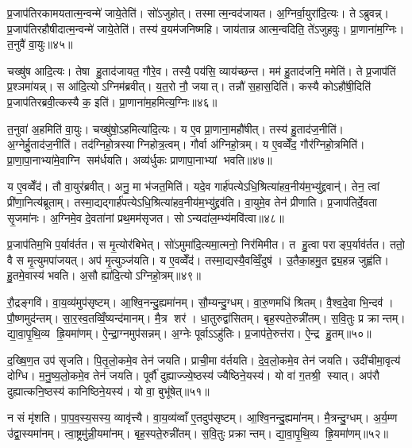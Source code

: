 प्र॒जाप॑तिरकामयतात्म॒न्वन्मे॑ जाये॒तेति॑। सो॑ऽजुहोत्। तस्मात्म॒न्वद॑जायत। अ॒ग्निर्वा॒युरा॑दि॒त्यः। तेऽब्रुवन्न्। प्र॒जाप॑तिरहौषीदात्म॒न्वन्मे॑ जाये॒तेति॑। तस्य॑ व॒यम॑जनिष्महि। जाय॑तान्न आत्म॒न्वदिति॒ ते॑ऽजुहवुः। प्रा॒णाना॑म॒ग्निः। त॒नुवै॑ वा॒युः॥४५॥

चख्षु॑ष आदि॒त्यः। तेषा हु॒ताद॑जायत॒ गौरे॒व। तस्यै॒ पय॑सि॒ व्याय॑च्छन्त। मम॑ हु॒ताद॑जनि॒ ममेति॑। ते प्र॒जाप॑तिं प्र॒श्ञमा॑यन्न्। स आ॑दि॒त्योऽग्निम॑ब्रवीत्। य॒त॒रो नौ॒ जयात्। तन्नौ॑ स॒हास॒दिति॑। कस्यै कोऽहौ॑षी॒दिति॑ प्र॒जाप॑तिरब्रवी॒त्कस्यै क॒ इति॑। प्रा॒णाना॑म॒हमित्य॒ग्निः॥४६॥

त॒नुवा॑ अ॒हमिति॑ वा॒युः। चख्षु॑षो॒ऽहमित्या॑दि॒त्यः। य ए॒व प्रा॒णाना॒महौ॑षीत्। तस्य॑ हु॒ताद॑ज॒नीति॑। अ॒ग्नेर्\mbox{}हु॒ताद॑ज॒नीति॑। तद॑ग्निहो॒त्रस्याग्निहोत्र॒त्वम्। गौर्वा अ॑ग्निहो॒त्रम्। य ए॒वव्वेँद॒ गौर॑ग्निहो॒त्रमिति॑। प्रा॒णा॒पा॒नाभ्या॑मे॒वाग्नि सम॑र्धयति। अव्य॑र्धुकः प्राणापा॒नाभ्यां भवति॥४७॥

य ए॒वव्वेँद॑। तौ वा॒युर॑ब्रवीत्। अनु॒ मा भ॑जत॒मिति॑। यदे॒व गार्\mbox{}ह॑पत्येऽधि॒श्रित्या॑हव॒नीय॑म॒भ्यु॑द्द्रवान्॑। तेन॒ त्वां प्री॑णा॒नित्य॑ब्रूताम्। तस्मा॒द्यद्गार्\mbox{}ह॑पत्येऽधि॒श्रित्या॑हव॒नीय॑म॒भ्यु॑द्द्रव॑ति। वा॒युमे॒व तेन॑ प्रीणाति। प्र॒जाप॑तिर्दे॒वता सृ॒जमा॑नः। अ॒ग्निमे॒व दे॒वता॑नां प्रथ॒मम॑सृजत। सोऽन्यदा॑ल॒म्भ्य॑मवि॑त्वा॥४८॥

प्र॒जाप॑तिम॒भि प॒र्याव॑र्तत। स मृ॒त्योर॑बिभेत्। सो॑ऽमुमा॑दि॒त्यमा॒त्मनो॒ निर॑मिमीत। त हु॒त्वा पराङ्प॒र्याव॑र्तत। ततो॒ वै स मृ॒त्युमपा॑जयत्। अप॑ मृ॒त्युञ्ज॑यति। य ए॒वव्वेँद॑। तस्मा॒द्यस्यै॒वव्विँ॒दुष॑। उ॒तैका॒हमु॒त द्व्य॒हन्न जुह्व॑ति। हु॒तमे॒वास्य॑ भवति। अ॒सौ ह्या॑दि॒त्योऽग्निहो॒त्रम्॥४९॥\anuvakamend[त॒नुवै॑ वा॒युर॒ग्निर्भ॑व॒त्यवि॑त्वा भव॒त्येक॑ञ्च]

रौ॒द्रङ्गवि॑। वा॒य॒व्य॑मुप॑सृष्टम्। आ॒श्वि॒नन्दु॒ह्यमा॑नम्। सौ॒म्यन्दु॒ग्धम्। वा॒रु॒णमधि॑ श्रितम्। वै॒श्व॒दे॒वा भि॒न्दव॑। पौ॒ष्णमुद॑न्तम्। सा॒र॒स्व॒तव्विँ॒ष्यन्द॑मानम्। मै॒त्र शर॑। धा॒तुरुद्वा॑सितम्। बृह॒स्पते॒रुन्नी॑तम्। स॒वि॒तुः प्र क्रान्तम्। द्या॒वा॒पृ॒थि॒व्य ह्रि॒यमा॑णम्। ऐ॒न्द्रा॒ग्नमुप॑सन्नम्। अ॒ग्नेः पूर्वाऽऽहु॑तिः। प्र॒जाप॑ते॒रुत्त॑रा। ऐ॒न्द्र हु॒तम्॥५०॥\anuvakamend[उद्वा॑सित स॒प्त च॑]

द॒ख्षि॒ण॒त उप॑ सृजति। पि॒तृ॒लो॒कमे॒व तेन॑ जयति। प्राची॒मा व॑र्तयति। दे॒व॒लो॒कमे॒व तेन॑ जयति। उदी॑चीमा॒वृत्य॑ दोग्धि। म॒नु॒ष्य॒लो॒कमे॒व तेन॑ जयति। पूर्वौ॑ दुह्याज्ज्ये॒ष्ठस्य॑ ज्यैष्ठिने॒यस्य॑। यो वा॑ ग॒तश्री॒ स्यात्। अप॑रौ दुह्यात्कनि॒ष्ठस्य॑ कानिष्ठिने॒यस्य॑। यो वा॒ बुभू॑षेत्॥५१॥

न सं मृ॑शति। पा॒प॒व॒स्य॒सस्य॒ व्यावृ॑त्त्यै। वा॒य॒व्य॑व्वाँ ए॒तदुप॑सृष्टम्। आ॒श्वि॒नन्दु॒ह्यमा॑नम्। मै॒त्रन्दु॒ग्धम्। अ॒र्य॒म्ण उ॑द्वा॒स्यमा॑नम्। त्वा॒ष्ट्रमु॑न्नी॒यमा॑नम्। बृह॒स्पते॒रुन्नी॑तम्। स॒वि॒तुः प्रक्रान्तम्। द्या॒वा॒पृ॒थि॒व्य ह्रि॒यमा॑णम्॥५२॥

